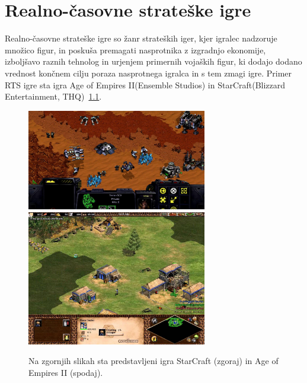 \documentclass[a4paper, 12pt]{book}
\begin{document}

\chapter{Realno-časovne strateške igre}
\label{chrts}

Realno-časovne strateške igre so žanr strateških iger, kjer igralec nadzoruje množico figur, in poskuša premagati nasprotnika z izgradnjo ekonomije, izboljšavo raznih tehnolog in urjenjem primernih vojaških figur, ki dodajo dodano vrednost končnem cilju poraza nasprotnega igralca in s tem zmagi igre. 
Primer RTS igre sta igra Age of Empires II(Ensemble Studios) in StarCraft(Blizzard Entertainment, THQ)~\ref{picRtsGames}. 

\begin{figure}[h]
	\begin{center}
		\includegraphics[width=0.7\textwidth]{photos/rts_sc1.pdf}
		\includegraphics[width=0.7\textwidth]{photos/rts_aoe2.pdf}
	\end{center}
	\caption{Na zgornjih slikah sta predstavljeni igra StarCraft (zgoraj) in Age of Empires II (spodaj).}
	\label{picRtsGames}
\end{figure}
\end{document}
